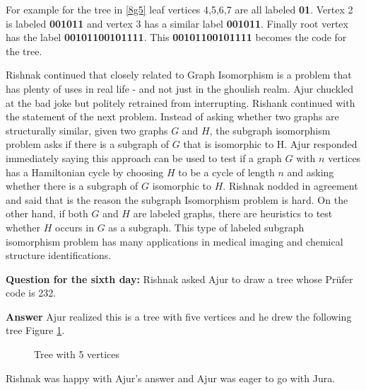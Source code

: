 For example for the tree in \ref{8g5} leaf vertices 4,5,6,7 are all labeled \textbf{01}. Vertex 2 is labeled \textbf{001011} and vertex 3 has a similar label \textbf{001011}. Finally root vertex has the label \textbf{00101100101111}. This \textbf{00101100101111} becomes the code for the tree.

Rishnak continued that closely related to Graph Isomorphism is a problem that has plenty of uses in real life - and not just in the ghoulish realm. Ajur chuckled at the bad joke but politely retrained from interrupting. Rishank continued with the statement of the next problem.  Instead of asking whether two graphs are structurally similar, given two graphs $G$ and $H$, the subgraph isomorphism problem asks if there is a subgraph of $G$ that is isomorphic to H. Ajur responded immediately saying this approach can be used to test if a graph $G$ with $n$ vertices has a Hamiltonian cycle by choosing $H$ to be a cycle of length $n$ and asking whether there is a subgraph of $G$ isomorphic to $H$. Rishnak nodded in agreement and said that is the reason the subgraph Isomorphism problem is hard. On the other hand, if both $G$ and $H$ are labeled graphs, there are heuristics to test whether $H$ occurs in $G$ as a subgraph. This type of labeled subgraph isomorphism problem has many applications in medical imaging and chemical structure identifications.

\textbf{Question for the sixth day:} Rishnak asked Ajur to draw a tree whose Pr{\"u}fer code is 232.

\textbf{Answer} Ajur realized this is a tree with five vertices and he drew the following tree Figure \ref{6q1}.
\begin{figure}
\begin{center}


\caption{Tree with 5 vertices}\label{6q1}
\end{center}
\end{figure}

Rishnak was happy with Ajur's answer and Ajur was eager to go with Jura.
